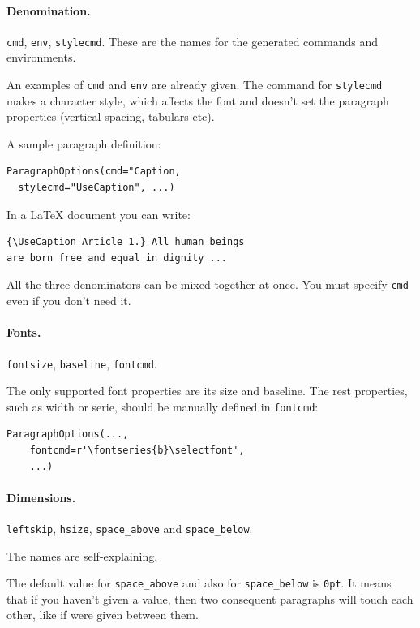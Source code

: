 \documentclass[]{ltugboat}
\begin{document}
\paragraph{Denomination.} \verb|cmd|, \verb|env|, \verb|stylecmd|. These are the names for the generated commands and environments.

An examples of \verb|cmd| and \verb|env| are already given. The command for \verb|stylecmd| makes a character style, which affects the font and doesn't set the paragraph properties (vertical spacing, tabulars etc).

A sample paragraph definition:

\begin{verbatim}
ParagraphOptions(cmd="Caption,
  stylecmd="UseCaption", ...)
\end{verbatim}

In a \LaTeX{} document you can write:

\begin{verbatim}
{\UseCaption Article 1.} All human beings
are born free and equal in dignity ...
\end{verbatim}

All the three denominators can be mixed together at once. You must specify \verb|cmd| even if you don't need it.

\paragraph{Fonts.} \verb|fontsize|, \verb|baseline|, \verb|fontcmd|.

The only supported font properties are its size and baseline. The rest properties, such as width or serie, should be manually defined in \verb|fontcmd|:

\begin{verbatim}
ParagraphOptions(...,
    fontcmd=r'\fontseries{b}\selectfont',
    ...)
\end{verbatim}

\paragraph{Dimensions.} \verb|leftskip|, \verb|hsize|, \verb|space_above| and \verb|space_below|.

The names are self-explaining.

The default value for \verb|space_above| and also for \verb|space_below| is \verb|0pt|. It means that if you haven't given a value, then two consequent paragraphs will touch each other, like if  were given between them.
\end{document}
